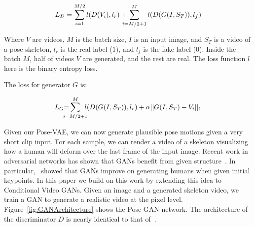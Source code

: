 \vspace{-.3cm}
\begin{equation}
\begin{split}
L_{D} = \sum_{i=1}^{M/2} l(D(V_{i}),l_r)+\hspace{-.3cm}
\sum_{i=M/2+1}^{M} l(D(G(I, S_{T})),l_f)
\end{split}
\end{equation}
\vspace{-.3cm}

Where $V$ are videos, $M$ is the batch size, $I$ is an input image, and $S_{T}$ is a video of a pose skeleton, $l_r$ is the real label ($1$), and $l_f$ is the fake label ($0$). Inside the batch $M$, half of videos $V$ are generated, and the rest are real. The loss function $l$ here is the binary entropy loss. 




The loss for generator $G$ is:

\vspace{-.5cm}
\begin{equation}
\begin{split}
L_{G} \hspace{-.1cm} = \hspace{-.4cm} \sum_{i=M/2+1}^{M} \hspace{-.2cm} l(D(G(I, S_{T})),l_r) +
\vspace{-10.0cm} \alpha||G(I, S_{T}) - V_{i}||_1
\end{split}
\end{equation}
\vspace{-.5cm}

Given our Pose-VAE, we can now generate plausible pose motions given a very short clip input. For each sample, we can render a video of a skeleton visualizing how a human will deform over the last frame of the input image. Recent work in adversarial networks has shown that GANs benefit from given structure~\cite{Isola16, Pathak16, Reed16}. In particular,~\cite{Reed16} showed that GANs improve on generating humans when given initial keypoints. In this paper we build on this work by extending this idea to Conditional Video GANs. Given an image and a generated skeleton video, we train a GAN to generate a realistic video at the pixel level. Figure~\ref{fig:GANArchitecture} shows the Pose-GAN network. The architecture of the discriminator $D$ is nearly identical to that of~\cite{Vondrick16}. 

